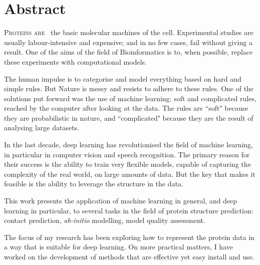 \chapter{Abstract}
\lettrine[lines=3, lhang=0.25, nindent=0em, findent=2pt]{\color{Maroon}P}{roteins are\ }
the basic molecular machines of the cell.
Experimental studies are usually labour-intensive and expensive; and in no few cases, fail without giving a result.
One of the aims of the field of Bioinformatics is to, when possible, replace these experiments with computational models.

The human impulse is to categorise and model everything based on hard and simple rules.
But Nature is messy and resists to adhere to these rules.
One of the solutions put forward was the use of machine learning: soft and complicated rules, reached by the computer after looking at the data.
The rules are ``soft" because they are probabilistic in nature, and ``complicated" because they are the result of analysing large datasets.

In the last decade, deep learning has revolutionised the field of machine learning, in particular in computer vision and speech recognition.
The primary reason for their success is the ability to train very flexible models, capable of capturing the complexity of the real world, on large amounts of data.
But the key that makes it feasible is the ability to leverage the structure in the data. 

This work presents the application of machine learning in general, and deep learning in particular, to several tasks in the field of protein structure prediction: contact prediction, \emph{ab-initio} modelling, model quality assessment.

The focus of my research has been exploring how to represent the protein data in a way that is suitable for deep learning.
On more practical matters, I have worked on the development of methods that are effective yet easy install and use.
